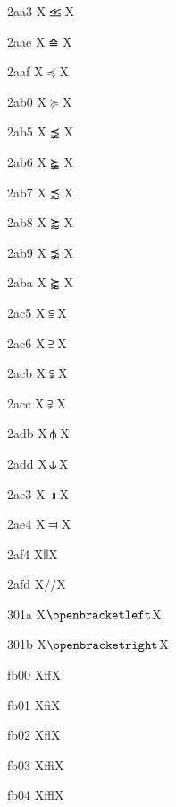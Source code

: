 \documentclass[11pt]{article}
\begin{document}
2aa3 X{\ensuremath{\partialmeetcontraction}}X

2aae X{\ensuremath{\bumpeqq}}X

2aaf X{\ensuremath{\preceq}}X

2ab0 X{\ensuremath{\succeq}}X

2ab5 X{\ensuremath{\precneqq}}X

2ab6 X{\ensuremath{\succneqq}}X

2ab7 X{\ensuremath{\precapprox}}X

2ab8 X{\ensuremath{\succapprox}}X

2ab9 X{\ensuremath{\precnapprox}}X

2aba X{\ensuremath{\succnapprox}}X

2ac5 X{\ensuremath{\subseteqq}}X

2ac6 X{\ensuremath{\supseteqq}}X

2acb X{\ensuremath{\subsetneqq}}X

2acc X{\ensuremath{\supsetneqq}}X

2adb X{\ensuremath{\mlcp}}X

2add X{\ensuremath{\forksnot}}X

2ae3 X{\ensuremath{\dashV}}X

2ae4 X{\ensuremath{\Dashv}}X

2af4 X{\ensuremath{\interleave}}X

2afd X{\ensuremath{{{/}\!\!{/}}}}X

301a X{\ensuremath{\openbracketleft}}X

301b X{\ensuremath{\openbracketright}}X

fb00 X{ff}X

fb01 X{fi}X

fb02 X{fl}X

fb03 X{ffi}X

fb04 X{ffl}X
\end{document}
